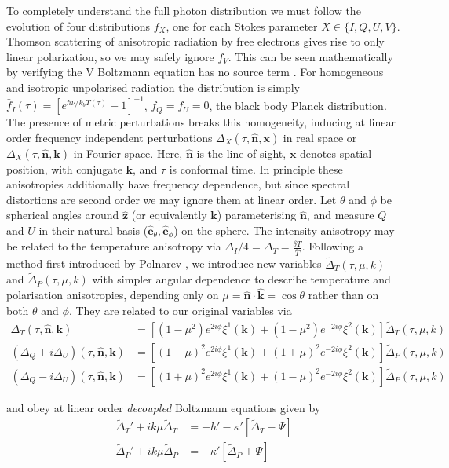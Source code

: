 \documentclass[a4paper,10pt]{article}
\renewcommand{\v}[1]{\mathbf{#1}}
\newcommand{\unit}[1]{\hat{\v{#1}}}
\begin{document}
To completely understand the full photon distribution we must follow the evolution of four distributions $f_X$, one for each Stokes parameter $X\in\{I,Q,U,V\}$. Thomson scattering of anisotropic radiation by free electrons gives rise to only linear polarization, so we may safely ignore $f_V$. This can be seen mathematically by verifying the V Boltzmann equation has no source term \cite{kowosky}. For homogeneous and isotropic unpolarised radiation the distribution is simply $\bar{f}_I(\tau)= [e^{\hbar \nu/k_b T(\tau)}-1]^{-1}$, $f_Q=f_U=0$, the black body Planck distribution. The presence of metric perturbations breaks this homogeneity, inducing at linear order frequency independent perturbations $\Delta_X(\tau,\unit{n},\v{x})$ in real space or $\Delta_X(\tau,\unit{n},\v{k})$ in Fourier space.  Here, $\unit{n}$ is the line of sight, $\v{x}$ denotes spatial position, with conjugate $\v{k}$, and $\tau$ is conformal time. In principle these anisotropies additionally have frequency dependence, but since spectral distortions are second order we may ignore them at linear order. Let $\theta$ and $\phi$ be spherical angles around $\unit{z}$ (or equivalently $\v{k}$) parameterising $\unit{n}$, and measure $Q$ and $U$ in their natural basis ($\unit{e}_\theta, \unit{e}_\phi$) on the sphere. The intensity anisotropy may be related to the temperature anisotropy via $\Delta_I/4=\Delta_T=\frac{\delta T}{\bar{T}}$. Following a method first introduced by Polnarev \cite{Polnarev}, we introduce new variables $\tilde{\Delta}_T(\tau,\mu,k)$ and $\tilde{\Delta}_P(\tau,\mu,k)$ with simpler angular dependence to describe temperature and polarisation anisotropies, depending only on $\mu=\unit{n}\cdot\unit{k}=\cos\theta$ rather than on both $\theta$ and $\phi$. They are related to our original variables via
\begin{equation}\begin{split}
\Delta_T(\tau,\unit{n},\v{k}) &= [(1-\mu^2) e^{2i\phi} \xi^1(\v{k})+(1-\mu^2) e^{-2i\phi} \xi^2(\v{k})]\tilde{\Delta}_T(\tau,\mu,k)\\
(\Delta_Q+i\Delta_U)(\tau,\unit{n},\v{k}) &=[(1-\mu)^2 e^{2i\phi} \xi^1(\v{k})+(1+\mu)^2 e^{-2i\phi} \xi^2(\v{k})]\tilde{\Delta}_P(\tau,\mu,k) \\
(\Delta_Q-i\Delta_U)(\tau,\unit{n},\v{k}) &=[(1+\mu)^2 e^{2i\phi} \xi^1(\v{k})+(1-\mu)^2 e^{-2i\phi} \xi^2(\v{k})]\tilde{\Delta}_P(\tau,\mu,k)
\end{split}\end{equation}

and obey at linear order \textit{decoupled} Boltzmann equations given by \cite{Polnarev}
\begin{equation}\begin{split}
\tilde{\Delta}_T'+ik\mu \tilde{\Delta}_T &= -h' -\kappa'[\tilde{\Delta}_T - \Psi]\\
\tilde{\Delta}_P'+ik\mu\tilde{\Delta}_P &= -\kappa'[\tilde{\Delta}_P + \Psi]
\end{split}
\label{Boltzmann}\end{equation}
\end{document}
